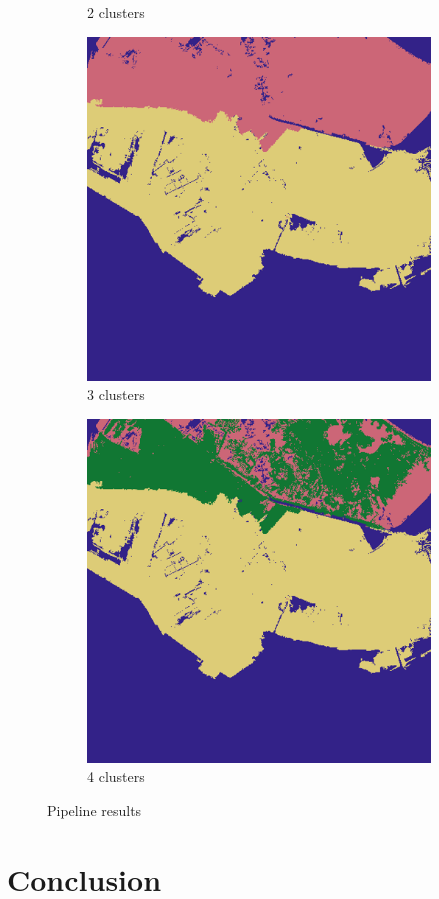 \documentclass[journal,compsoc]{IEEEtran}
\begin{document}
\begin{figure}[t!]
\begin{subfigure}[b]{0.4\textwidth}
		\caption{2 clusters}
		\label{2 clusters}
	\end{subfigure}
	\hfill
	\begin{subfigure}[b]{0.4\textwidth}
		\centering
		\includegraphics[width=\textwidth]{3clusters}
		\caption{3 clusters}
		\label{3 clusters}
	\end{subfigure}
	\hfill
	\begin{subfigure}[b]{0.4\textwidth}
		\centering
		\includegraphics[width=\textwidth]{4clusters}
		\caption{4 clusters}
		\label{4 clusters}
	\end{subfigure}
	\caption{Pipeline results}
	\label{Pipeline results}
\end{figure}
		


\section{Conclusion}



	
	
\end{document}
